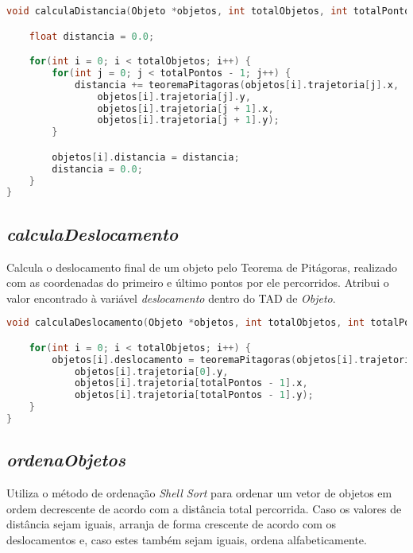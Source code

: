 \documentclass{article}
\begin{document}
\begin{lstlisting}[label={lst:cod1},language=C]
void calculaDistancia(Objeto *objetos, int totalObjetos, int totalPontos) {

    float distancia = 0.0;

    for(int i = 0; i < totalObjetos; i++) {
        for(int j = 0; j < totalPontos - 1; j++) {
            distancia += teoremaPitagoras(objetos[i].trajetoria[j].x,
                objetos[i].trajetoria[j].y,
                objetos[i].trajetoria[j + 1].x,
                objetos[i].trajetoria[j + 1].y);
        }

        objetos[i].distancia = distancia;
        distancia = 0.0;
    }
}
\end{lstlisting}


\subsection{\textit{calculaDeslocamento}}

\hspace*{\parindent}Calcula o deslocamento final de um objeto pelo Teorema de Pitágoras, realizado com as coordenadas do primeiro e último pontos por ele percorridos. Atribui o valor encontrado à variável \textit{deslocamento} dentro do TAD de \textit{Objeto}.

\begin{lstlisting}[label={lst:cod1},language=C]
void calculaDeslocamento(Objeto *objetos, int totalObjetos, int totalPontos) {

    for(int i = 0; i < totalObjetos; i++) {
        objetos[i].deslocamento = teoremaPitagoras(objetos[i].trajetoria[0].x,
            objetos[i].trajetoria[0].y,
            objetos[i].trajetoria[totalPontos - 1].x,
            objetos[i].trajetoria[totalPontos - 1].y);
    }
}
\end{lstlisting}


\subsection{\textit{ordenaObjetos}}

\hspace*{\parindent}Utiliza o método de ordenação \textit{Shell Sort} para ordenar um vetor de objetos em ordem decrescente de acordo com a distância total percorrida. Caso os valores de distância sejam iguais, arranja de forma crescente de acordo com os deslocamentos e, caso estes também sejam iguais, ordena alfabeticamente.
\end{document}
